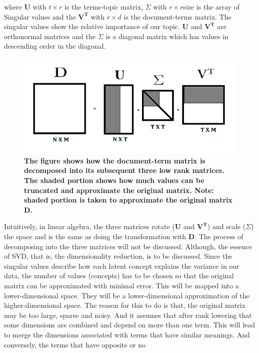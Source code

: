 \documentclass[12pt]{report}
\begin{document}
        where \textbf{U} with ${t \times r}$ is the terms-topic matrix, ${\Sigma}$ with ${r \times r}$size is the array of Singular values and
        the ${\mathbf{V^T}}$ with ${r \times d}$ is the document-terms matrix.
        The singular values show the relative importance of our topic. \textbf{U} and ${\mathbf{V^T}}$ are orthonormal matrices and the ${\Sigma}$ is a diagonal matrix which has values
        in descending order in the diagonal.
        \begin{figure}
            \centering
            \includegraphics[scale=0.7]{lsa.png}
            \caption{\textbf{The figure shows how the document-term matrix is decomposed into its subsequent three low rank matrices. The shaded portion shows how much
            values can be truncated and approximate the original matrix. Note: shaded portion is taken to approximate the original matrix \textbf{D}.}}
        \end{figure}
        Intuitively, in linear algebra, the three matrices rotate (\textbf{U} and ${\mathbf{V^T}}$) and scale (${\Sigma}$) the space and is the same as doing
        the transformation with \textbf{D}.
        The process of decomposing into the three matrices will not be discussed. Although, the essence of SVD, that is, the dimensionality reduction, is to be discussed.
        Since the singular values describe how each latent concept explains the variance in our data, the number of values (concepts) has to be chosen so that the original
        matrix can be approximated with minimal error. This will be mapped into a lower-dimensional space. They will be a lower-dimensional approximation of the higher-dimensional space.
        The reason for this to do is that, the original matrix may be too large, sparse and noisy. And it assumes that after rank lowering that some dimensions are combined and
        depend on more than one term. This will lead to merge the dimensions associated with terms that have similar meanings. And conversely, the terms that have opposite or no
\end{document}
